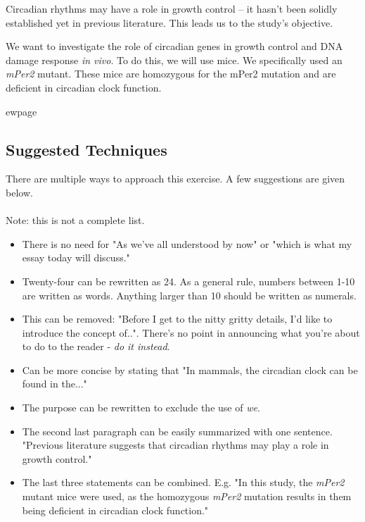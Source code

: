 \documentclass{article}
\begin{document}
Circadian rhythms may have a role in growth control – it hasn’t been solidly established yet in previous literature. This leads us to the study’s objective.

We want to investigate the role of circadian genes in growth control and DNA damage response \textit{in vivo}. To do this, we will use mice. We specifically used an \textit{mPer2} mutant. These mice are homozygous for the mPer2 mutation and are deficient in circadian clock function. 


ewpage
\subsection*{Suggested Techniques}

There are multiple ways to approach this exercise. A few suggestions are given below. 
\paragraph{} Note: this is not a complete list.

\begin{itemize}
\item There is no need for "As we've all understood by now" or "which is what my essay today will discuss."
\item Twenty-four can be rewritten as 24. As a general rule, numbers between 1-10 are written as words. Anything larger than 10 should be written as numerals.
\item This can be removed: "Before I get to the nitty gritty details, I’d like to introduce the concept of..". There's no point in announcing what you're about to do to the reader - \textit{do it instead}.
\item Can be more concise by stating that "In mammals, the circadian clock can be found in the..."
\item The purpose can be rewritten to exclude the use of \textit{we}.
\item The second last paragraph can be easily summarized with one sentence. "Previous literature suggests that circadian rhythms may play a role in growth control."
\item The last three statements can be combined. E.g. "In this study, the \textit{mPer2} mutant mice were used, as the homozygous \textit{mPer2} mutation results in them being deficient in circadian clock function."
\end{itemize}
\end{document}
